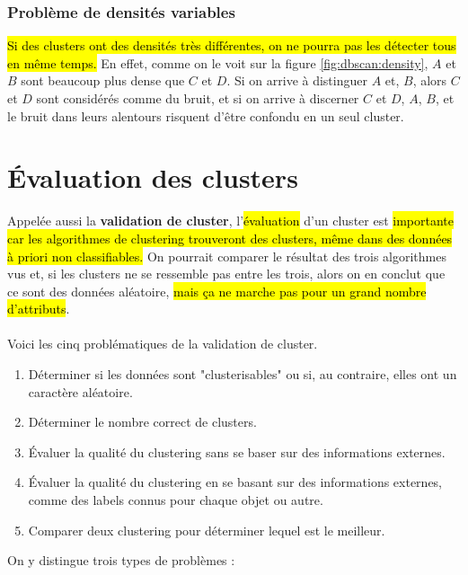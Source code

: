 \documentclass[letterpaper, 12pt]{article}
\newcommand{\alinea}{
\hspace*{0.5cm}}
\begin{document}
			\subsubsection{Problème de densités variables}
				\alinea \hl{Si des clusters ont des densités très différentes,
					on ne pourra pas les détecter tous en même temps.}
					En effet, comme on le voit sur la figure 
					\ref{fig:dbscan:density}, $A$ et $B$ sont beaucoup plus
					dense que $C$ et $D$. Si on arrive à distinguer $A$ et, 
					$B$, alors $C$ et $D$ sont considérés comme du bruit, 
					et si on arrive à discerner $C$ et $D$, $A$, $B$, et 
					le bruit dans leurs alentours risquent d'être confondu
					en un seul cluster.
	\section{\'Evaluation des clusters}
		\alinea Appelée aussi la \textbf{validation de cluster},
			l'\hl{évaluation}
			d'un cluster est \hl{importante car les algorithmes de clustering
			trouveront des clusters, même dans des données à priori non 
			classifiables.} On pourrait comparer le résultat des trois
			algorithmes vus et, si les clusters ne se ressemble pas 
			entre les trois, alors on en conclut que ce sont des données
			aléatoire, \hl{mais ça ne marche pas pour un grand nombre
			d'attributs}. \\
		~\\
		\alinea Voici les cinq problématiques de la validation de cluster.
		\begin{enumerate}
			\setlength{\itemsep}{0pt}
			\setlength{\parskip}{0pt}
			\setlength{\parsep}{0pt}
			\item Déterminer si les données sont "clusterisables" ou si, 
				au contraire, elles ont un caractère aléatoire.
			\item Déterminer le nombre correct de clusters.
			\item \'Evaluer la qualité du clustering sans se baser
				sur des informations externes.
			\item \'Evaluer la qualité du clustering en se basant
				sur des informations externes, comme des labels connus
				pour chaque objet ou autre.
			\item Comparer deux clustering pour déterminer lequel 
				est le meilleur.
		\end{enumerate}
		On y distingue trois types de problèmes : \\~\\
\end{document}
